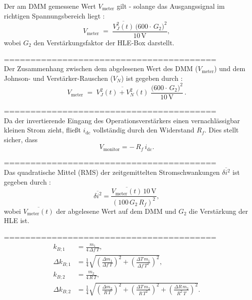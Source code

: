 Der am DMM gemessene Wert $V_{\mathrm{meter}}$ gilt - solange das Ausgangssignal im richtigen Spannungsbereich liegt \cite{praktikum}:
\begin{equation}
  V_{\mathrm{meter}} \;=\; \frac{\overline{V_J^2(t)}\,\bigl(600 \cdot \,G_2\bigr)^2}{10\,\mathrm{V}},
\end{equation}
wobei $G_2$ den Verstärkungsfaktor der HLE-Box darstellt.

========================================\\
Der Zusammenhang zwischen dem abgelesenen Wert des DMM ($V_{\mathrm{meter}}$) und dem Johnson- und Verstärker-Rauschen ($V_N$) ist gegeben durch \cite{praktikum}:
\begin{equation}
  V_{\mathrm{meter}}
  \;=\;
  \overline{V_J^2(t) + V_N^2(t)}\;\frac{\bigl(600 \cdot \,G_2\bigr)^2}{10\,\mathrm{V}}\,.
\end{equation}

========================================\\

Da der invertierende Eingang des Operationsverstärkers einen vernachlässigbar kleinen Strom zieht, fließt $i_{\mathrm{dc}}$ vollständig durch den Widerstand $R_f$. Dies stellt sicher, dass \cite{praktikum}
\begin{equation}
  V_{\mathrm{monitor}} = -\,R_{f}\,i_{\mathrm{dc}}. 
\end{equation}


========================================\\
Das quadratische Mittel (RMS) der zeitgemittelten Stromschwankungen $\overline{\delta i^2}$ ist gegeben durch \cite{praktikum}:
\begin{equation}
  \overline{\delta i^2}
  = \frac{\overline{V_{\mathrm{meter}}(t)}\,10\,\mathrm{V}}
         {(100\,G_2\,R_f)^2},
\end{equation}
wobei $\overline{V_{\mathrm{meter}}(t)}$ der abgelesene Wert auf dem DMM und $G_2$ die Verstärkung der HLE ist.


========================================\\

\begin{align}
k_{B;1} &= \frac{m_1}{4\,\Delta f\,T}, \label{eq:kB1}\\[6pt]
\Delta k_{B;1} &= \frac{1}{4}
\sqrt{
  \left(\frac{\Delta m_1}{\Delta f\,T}\right)^2
  + \left(\frac{\Delta T\,m_1}{\Delta f\,T^2}\right)^2
},\label{eq:dkB1}\\[6pt]
k_{B;2} &= \frac{m_2}{4\,R\,T}, \label{eq:kB2}\\[6pt]
\Delta k_{B;2} &= \frac{1}{4}
\sqrt{
  \left(\frac{\Delta m_2}{R\,T}\right)^2
  + \left(\frac{\Delta T\,m_2}{R\,T^2}\right)^2
  + \left(\frac{\Delta R\,m_2}{R^2\,T}\right)^2
}.\label{eq:dkB2}
\end{align}


